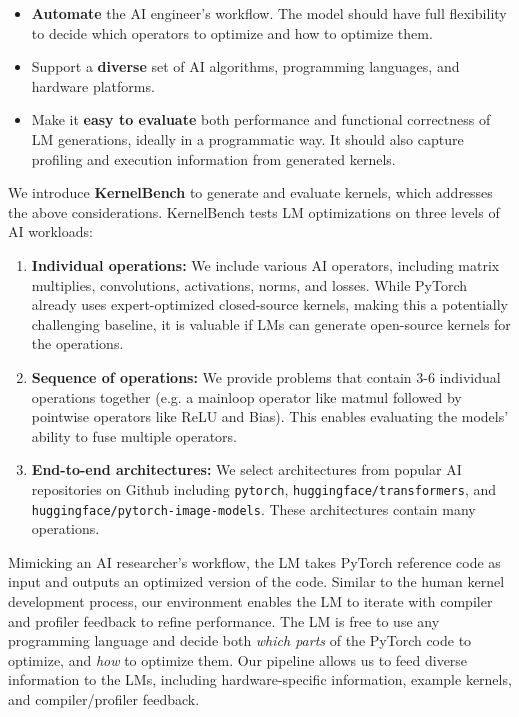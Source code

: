 \begin{itemize}[itemsep=0.1pt,topsep=0pt,leftmargin=*]
    \item \textbf{Automate} the AI engineer's workflow. The model should have full flexibility to decide which operators to optimize and how to optimize them.
    \item Support a \textbf{diverse} set of AI algorithms, programming languages, and hardware platforms.
    \item Make it \textbf{easy to evaluate} both performance and functional correctness of LM generations, ideally in a programmatic way. It should also capture profiling and execution information from generated kernels. 
\end{itemize}

\noindent We introduce \textbf{KernelBench} to generate and evaluate kernels, which addresses the above considerations. KernelBench tests LM optimizations on three levels of AI workloads:
\begin{enumerate}[itemsep=0.1pt,topsep=0pt,leftmargin=*]
    \item \textbf{Individual operations:} We include various AI operators, including matrix multiplies, convolutions, activations, norms, and losses. While PyTorch already uses expert-optimized closed-source kernels, making this a potentially challenging baseline, it is valuable if LMs can generate open-source kernels for the operations.
    \item \textbf{Sequence of operations:} We provide problems that contain 3-6 individual operations together (e.g. a mainloop operator like matmul followed by pointwise operators like ReLU and Bias). This enables evaluating the models' ability to fuse multiple operators.
    \item \textbf{End-to-end architectures:} We select architectures from popular AI repositories on Github including \texttt{pytorch}, \texttt{huggingface/transformers}, and \texttt{huggingface/pytorch-image-models}. These architectures contain many operations.
\end{enumerate}

\noindent Mimicking an AI researcher's workflow, the LM takes PyTorch reference code as input and outputs an optimized version of the code.
Similar to the human kernel development process, our environment enables the LM to iterate with compiler and profiler feedback to refine performance. The LM is free to use any programming language and decide both \textit{which parts} of the PyTorch code to optimize, and \textit{how} to optimize them. Our pipeline allows us to feed diverse information to the LMs, including hardware-specific information, example kernels, and compiler/profiler feedback.


